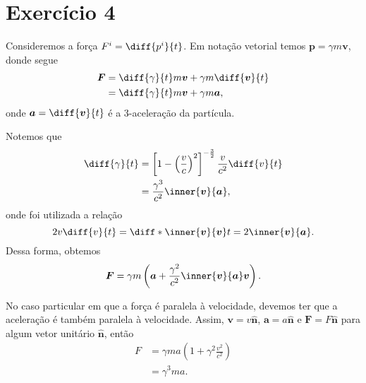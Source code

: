 \section*{Exercício 4}
Consideremos a força \(F^i = \diff{p^i}{t}\). Em notação vetorial temos \(\boldsymbol{p} = \gamma m \boldsymbol{v}\), donde segue
\begin{align*}
    \boldsymbol{F} &= \diff{\gamma}{t} m \boldsymbol{v} + \gamma m \diff{\boldsymbol{v}}{t}\\
            &= \diff{\gamma}{t}  m \boldsymbol{v} + \gamma m\boldsymbol{a},
\end{align*}
onde \(\boldsymbol{a} = \diff{\boldsymbol{v}}{t}\) é a 3-aceleração da partícula.

Notemos que
\begin{align*}
    \diff{\gamma}{t} &= \left[1 - \left(\frac{v}{c}\right)^2\right]^{-\frac32} \frac{v}{c^2}\diff{v}{t}\\
                     &= \frac{\gamma^3}{c^2} \inner{\boldsymbol{v}}{\boldsymbol{a}},
\end{align*}
onde foi utilizada a relação
\begin{equation*}
    2v\diff{v}{t} = \diff*{\inner{\boldsymbol{v}}{\boldsymbol{v}}}{t} = 2\inner{\boldsymbol{v}}{\boldsymbol{a}}.
\end{equation*}
Dessa forma, obtemos
\begin{equation*}
    \boldsymbol{F} = \gamma m \left(\boldsymbol{a} + \frac{\gamma^2}{c^2}\inner{\boldsymbol{v}}{\boldsymbol{a}}\boldsymbol{v}\right).
\end{equation*}

No caso particular em que a força é paralela à velocidade, devemos ter que a aceleração é também paralela à velocidade. Assim, \(\boldsymbol{v} = v \boldsymbol{\hat{n}}\), \(\boldsymbol{a} = a\boldsymbol{\hat{n}}\) e \(\boldsymbol{F} = F\boldsymbol{\hat{n}}\) para algum vetor unitário \(\boldsymbol{\hat{n}}\), então
\begin{align*}
    F &= \gamma ma \left(1 + \gamma^2\frac{v^2}{c^2}\right)\\
      &= \gamma^3 ma.
\end{align*}

